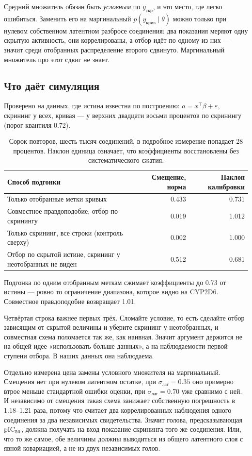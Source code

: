Средний множитель обязан быть \emph{условным} по $y_{\text{скр}}$, и это место, где легко ошибиться.
Заменить его на маргинальный $p(y_{\text{крив}}\mid\theta)$ можно только при нулевом собственном латентном
разбросе соединения: два показания меряют одну скрытую активность, они коррелированы, а отбор идёт
по одному из них --- значит среди отобранных распределение второго сдвинуто. Маргинальный множитель
про этот сдвиг не знает.

\subsection{Что даёт симуляция}

Проверено на данных, где истина известна по построению: $a = x^{\top}\beta + \varepsilon$, скрининг у всех,
кривая --- у верхних двадцати восьми процентов по скринингу (порог квантиля 0.72).

\begin{table}[htbp]\centering\small
\begin{tabularx}{\textwidth}{@{}Xrr@{}}
\toprule
Способ подгонки & Смещение, норма & Наклон калибровки \\
\midrule
Только отобранные метки кривых & 0.433 & 0.731 \\
Совместное правдоподобие, отбор по скринингу & 0.019 & 1.012 \\
Только скрининг, все строки (контроль сверху) & 0.002 & 1.000 \\
Отбор по скрытой истине, скрининг у неотобранных не виден & 0.512 & 0.681 \\
\bottomrule
\end{tabularx}
\caption{Сорок повторов, шесть тысяч соединений, в подробное измерение попадает 28 процентов. Наклон
единица означает, что коэффициенты восстановлены без систематического сжатия.}
\label{tab:mnar}
\end{table}

Подгонка по одним отобранным меткам сжимает коэффициенты до 0.73 от истины --- ровно то ограничение
диапазона, которое видно на CYP2D6. Совместное правдоподобие возвращает 1.01.

Четвёртая строка важнее первых трёх. Сломайте условие, то есть сделайте отбор зависящим от скрытой
величины и уберите скрининг у неотобранных, и совместная схема поломается так же, как наивная. Значит
аргумент держится не на общей идее «использовать больше данных», а на наблюдаемости первой ступени
отбора. В наших данных она наблюдаема.

Отдельно измерена цена замены условного множителя на маргинальный. Смещения нет при нулевом латентном
остатке, при $\sigma_{\text{лат}} = 0.35$ оно примерно втрое меньше стандартной ошибки оценки, при
$\sigma_{\text{лат}} = 0.70$ уже сравнимо с ней. И независимо от смещения такая схема занижает собственную
погрешность в 1.18--1.21 раза, потому что считает два коррелированных наблюдения одного соединения
за два независимых свидетельства. Значит голова, предсказывающая $\mathrm{pIC}_{50}$, должна получать на вход показание скрининга того же соединения.
Или, что то же самое, обе величины должны выводиться из общего латентного слоя с явной ковариацией,
а не из двух независимых голов.

